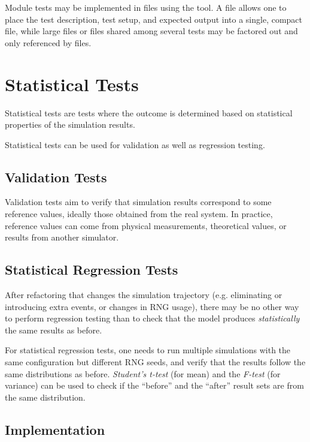Module tests may be implemented in  files using the 
tool. A  file allows one to place the test description, test setup,
and expected output into a single, compact file, while large files or files shared
among several tests may be factored out and only referenced by  files.


\section{Statistical Tests}
\label{sec:testing:statistical-tests}

Statistical tests are tests where the outcome is determined based on statistical
properties of the simulation results.

Statistical tests can be used for validation as well as regression testing.

\subsection{Validation Tests}
\label{sec:testing:validation-tests}

Validation tests aim to verify that simulation results correspond to some
reference values, ideally those obtained from the real system. In practice,
reference values can come from physical measurements, theoretical values, or
results from another simulator.

\subsection{Statistical Regression Tests}
\label{sec:testing:statistical-regression-tests}

After refactoring that changes the simulation trajectory (e.g. eliminating or
introducing extra events, or changes in RNG usage), there may be no other way to
perform regression testing than to check that the model produces
\textit{statistically} the same results as before.

For statistical regression tests, one needs to run multiple simulations with the
same configuration but different RNG seeds, and verify that the results follow
the same distributions as before. \textit{Student's t-test} (for mean) and the
\textit{F-test} (for variance) can be used to check if the ``before'' and the ``after''
result sets are from the same distribution.

\subsection{Implementation}
\label{sec:testing:statistical-tests-implementation}

